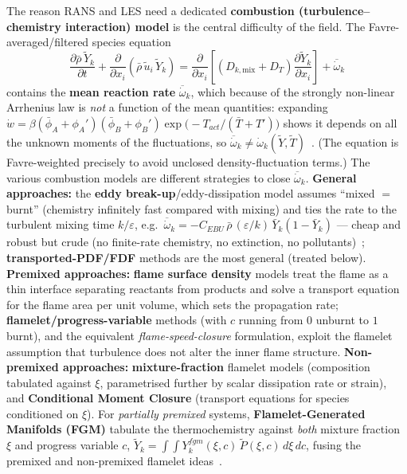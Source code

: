 {The reason RANS and LES need a dedicated \textbf{combustion (turbulence--chemistry interaction) model} is the central difficulty of the field. The Favre-averaged/filtered species equation
\begin{equation*}
\frac{\partial \bar\rho\, \tilde Y_k}{\partial t} + \frac{\partial}{\partial x_i}\!\left(\bar\rho\, \tilde u_i\, \tilde Y_k\right) = \frac{\partial}{\partial x_i}\!\left[\left(D_{k,\mathrm{mix}} + D_T\right)\frac{\partial \tilde Y_k}{\partial x_i}\right] + \overline{\dot\omega}_k
\end{equation*}
contains the \textbf{mean reaction rate} $\overline{\dot\omega}_k$, which because of the strongly non-linear Arrhenius law is \emph{not} a function of the mean quantities: expanding $\dot w = \beta(\bar\phi_A+\phi_A')(\bar\phi_B+\phi_B')\exp\!\big(-T_{act}/(\bar T+T')\big)$ shows it depends on all the unknown moments of the fluctuations, so $\overline{\dot\omega}_k \neq \dot\omega_k(\tilde Y,\tilde T)$~\cite{lecture10,warnatz2006combustion}. (The equation is Favre-weighted precisely to avoid unclosed density-fluctuation terms.) The various combustion models are different strategies to close $\overline{\dot\omega}_k$. \textbf{General approaches:} the \textbf{eddy break-up}/eddy-dissipation model assumes ``mixed $=$ burnt'' (chemistry infinitely fast compared with mixing) and ties the rate to the turbulent mixing time $k/\varepsilon$, e.g.\ $\overline{\dot\omega}_k = -C_{EBU}\,\bar\rho\,(\varepsilon/k)\,\bar Y_k(1-\bar Y_k)$ --- cheap and robust but crude (no finite-rate chemistry, no extinction, no pollutants)~\cite{lecture10}; \textbf{transported-PDF/FDF} methods are the most general (treated below). \textbf{Premixed approaches:} \textbf{flame surface density} models treat the flame as a thin interface separating reactants from products and solve a transport equation for the flame area per unit volume, which sets the propagation rate; \textbf{flamelet/progress-variable} methods (with $c$ running from $0$ unburnt to $1$ burnt), and the equivalent \emph{flame-speed-closure} formulation, exploit the flamelet assumption that turbulence does not alter the inner flame structure. \textbf{Non-premixed approaches:} \textbf{mixture-fraction} flamelet models (composition tabulated against $\xi$, parametrised further by scalar dissipation rate or strain), and \textbf{Conditional Moment Closure} (transport equations for species conditioned on $\xi$). For \emph{partially premixed} systems, \textbf{Flamelet-Generated Manifolds (FGM)} tabulate the thermochemistry against \emph{both} mixture fraction $\xi$ and progress variable $c$, $\tilde Y_k = \int\!\!\int Y_k^{fgm}(\xi,c)\,\tilde P(\xi,c)\,d\xi\,dc$, fusing the premixed and non-premixed flamelet ideas~\cite{lecture10,vanoijen2000fgm}.

}

